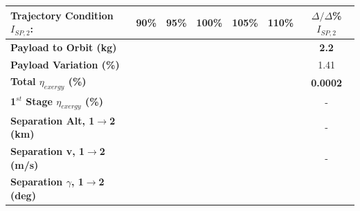 \begin{table}[ht!] %
	\centering
	\begin{tabular}{l c c c c c c} 
		\hline \textbf{Trajectory Condition}   \qquad  $I_{SP,2}$:
		&90\%
		&95\%
		&100\%
		&105\%
		&110\%
		& $\Delta/\Delta$\%$I_{SP,2}$
		\\
		\hline \textbf{Payload to Orbit (kg)}
		& \textbf{\PayloadToOrbitIspNinetyNoReturn}
		& \textbf{\PayloadToOrbitIspNinetyFiveNoReturn}
		& \textbf{\PayloadToOrbitIspStandardNoReturn}
		& \textbf{\PayloadToOrbitIspOneHundredFiveNoReturn}
		& \textbf{\PayloadToOrbitIspOneHundredTenNoReturn}
		&\textbf{2.2}
		\\
		\textbf{Payload Variation (\%)}
		& \PayloadVarIspNinetyNoReturn
		& \PayloadVarIspNinetyFiveNoReturn
		& \PayloadVarIspStandardNoReturn
		& \PayloadVarIspOneHundredFiveNoReturn
		& \PayloadVarIspOneHundredTenNoReturn
		&1.41
		\\
		\textbf{Total $\eta_{exergy}$ (\%)}
		& \textbf{\totalExergyEffIspNinetyNoReturn}
		& \textbf{\totalExergyEffIspNinetyFiveNoReturn}
		& \textbf{\totalExergyEffIspStandardNoReturn}
		& \textbf{\totalExergyEffIspOneHundredFiveNoReturn}
		& \textbf{\totalExergyEffIspOneHundredTenNoReturn}
		& \textbf{0.0002}
		\\
		\hline 
		\textbf{1$^{st}$ Stage $\eta_{exergy}$ (\%)}
		& \textbf{\firstExergyEffIspNinetyNoReturn}
		& \textbf{\firstExergyEffIspNinetyFiveNoReturn}
		& \textbf{\firstExergyEffIspStandardNoReturn}
		& \textbf{\firstExergyEffIspOneHundredFiveNoReturn}
		& \textbf{\firstExergyEffIspOneHundredTenNoReturn}
		& -
		\\
		\textbf{Separation Alt, 1$\rightarrow$2 (km)}
		& \firstsecondSeparationAltIspNinetyNoReturn
		& \firstsecondSeparationAltIspNinetyFiveNoReturn
		& \firstsecondSeparationAltIspStandardNoReturn
		& \firstsecondSeparationAltIspOneHundredFiveNoReturn
		& \firstsecondSeparationAltIspOneHundredTenNoReturn
		& -
		\\
		\textbf{Separation v, 1$\rightarrow$2 (m/s)}
		& \firstsecondSeparationvIspNinetyNoReturn
		& \firstsecondSeparationvIspNinetyFiveNoReturn
		& \firstsecondSeparationvIspStandardNoReturn
		& \firstsecondSeparationvIspOneHundredFiveNoReturn
		& \firstsecondSeparationvIspOneHundredTenNoReturn
		& -
		\\
		\textbf{Separation $\gamma$, 1$\rightarrow$2 (deg)}
		& \firstsecondSeparationgammaIspNinetyNoReturn
		& \firstsecondSeparationgammaIspNinetyFiveNoReturn
		& \firstsecondSeparationgammaIspStandardNoReturn
		& \firstsecondSeparationgammaIspOneHundredFiveNoReturn

\end{tabular}
\end{table}
